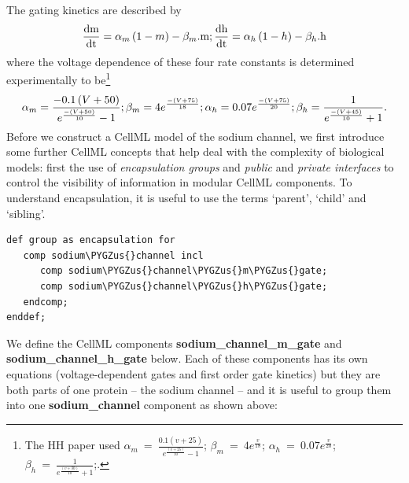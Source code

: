 \documentclass[a4paper,10pt,english]{sphinxmanual}
\def\PYGZus{\char`\_}
\begin{document}
The gating kinetics are described by
\begin{gather}
\begin{split}\frac{\text{dm}}{\text{dt}} = \alpha_{m}\left( 1 - m \right) - \beta_{m}\text{.m};
\frac{\text{dh}}{\text{dt}} = \alpha_{h}\left( 1 - h \right) - \beta_{h}\text{.h}\end{split}\notag
\end{gather}
where the voltage dependence of these four rate constants is determined
experimentally to be\footnote[1]{
The HH paper used \(\alpha_m\ =\ \frac{0.1(v+25)}{e^{\frac{(v+25)}{10}}-1}\); \(\beta_m\ =\ 4e^{\frac{v}{18}}\); \(\alpha_h\ =\ 0.07e^{\frac{v}{20}}\); \(\beta_h\ =\ \frac{1}{e^{\frac{(v+30)}{10}}+1}\);.
}
\begin{gather}
\begin{split}\alpha_{m} = \frac{- 0.1\left( V + 50 \right)}{e^{\frac{- \left( V + 50 \right)}{10}} - 1};
\beta_{m} = 4e^{\frac{- \left( V + 75 \right)}{18}};
\alpha_{h} = 0.07e^{\frac{- \left( V + 75 \right)}{20}};
\beta_{h} = \frac{1}{e^{\frac{- \left( V + 45 \right)}{10}} + 1}.\end{split}\notag
\end{gather}
Before we construct a CellML model of the sodium channel, we first
introduce some further CellML concepts that help deal with the
complexity of biological models: first the use of \emph{encapsulation groups}
and \emph{public} and \emph{private interfaces} to control the visibility of
information in modular CellML components. To understand encapsulation,
it is useful to use the terms ‘parent’, ‘child’ and ‘sibling’.

\begin{Verbatim}[commandchars=\\\{\}]
def group as encapsulation for
   comp sodium\PYGZus{}channel incl
      comp sodium\PYGZus{}channel\PYGZus{}m\PYGZus{}gate;
      comp sodium\PYGZus{}channel\PYGZus{}h\PYGZus{}gate;
   endcomp;
enddef;
\end{Verbatim}

We define the CellML components \textbf{sodium\_channel\_m\_gate} and
\textbf{sodium\_channel\_h\_gate} below. Each of these components has its own
equations (voltage-dependent gates and first order gate kinetics) but
they are both parts of one protein – the sodium channel – and it is
useful to group them into one \textbf{sodium\_channel} component as shown above:
\end{document}
